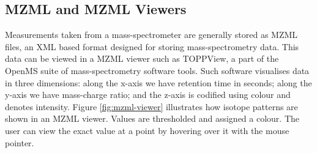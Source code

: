 \documentclass{l4proj}
\begin{document}
\subsection{MZML and MZML Viewers}
Measurements taken from a mass-spectrometer are generally stored as MZML files, an XML based format designed for storing mass-spectrometry data. This data can be viewed in a MZML viewer such as TOPPView\citep{openms}, a part of the OpenMS suite of mass-spectrometry software tools. Such software visualises data in three dimensions: along the x-axis we have retention time in seconds; along the y-axis we have mass-charge ratio; and the z-axis is codified using colour and denotes intensity. Figure \ref{fig:mzml-viewer} illustrates how isotope patterns are shown in an MZML viewer. Values are thresholded and assigned a colour. The user can view the exact value at a point by hovering over it with the mouse pointer.
\end{document}
